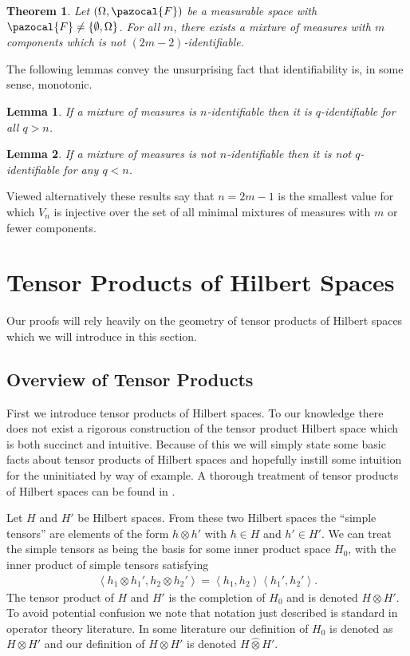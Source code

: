 \documentclass{article} %
\def\l{\left}
\def\r{\right}
\def\sF{\pazocal{F}}
\newtheorem{lem}{Lemma}
\newtheorem{thm}{Theorem}
\theoremstyle{definition}
\begin{document}
\begin{thm} \label{thm:noident}
	Let $\left( \Omega, \sF \right)$ be a measurable space with $\sF \neq \left\{ \emptyset,\Omega \right\}$. For all $m$, there exists a mixture of measures with $m$ components which is not $(2m-2)$-identifiable.
\end{thm}
The following lemmas convey the unsurprising fact that identifiability is, in some sense, monotonic. 
\begin{lem}\label{lem:ident}
	If a mixture of measures is $n$-identifiable then it is $q$-identifiable for all $q>n$.
\end{lem}
\begin{lem} \label{lem:noident}
	If a mixture of measures is not $n$-identifiable then it is not $q$-identifiable for any $q<n$.
\end{lem}
Viewed alternatively these results say that $n=2m-1$ is the smallest value for which $V_{n}$ is injective over the set of all minimal mixtures of measures with $m$ or fewer components.
\section{Tensor Products of Hilbert Spaces}
Our proofs will rely heavily on the geometry of tensor products of Hilbert spaces which we will introduce in this section.

\subsection{Overview of Tensor Products}
First we introduce tensor products of Hilbert spaces. To our knowledge there does not exist a rigorous construction of the tensor product Hilbert space which is both succinct and intuitive. Because of this we will simply state some basic facts about tensor products of Hilbert spaces and hopefully instill some intuition for the uninitiated by way of example. A thorough treatment of tensor products of Hilbert spaces can be found in \cite{kadison83}.

Let $H$ and $H'$ be Hilbert spaces. From these two Hilbert spaces the ``simple tensors'' are elements of the form $h\otimes h'$ with $h\in H$ and $h' \in H'$. We can treat the simple tensors as being the basis for some inner product space $H_0$, with the inner product of simple tensors satisfying
\begin{eqnarray*}
	\l<h_1 \otimes h_1', h_2 \otimes h_2'\r> = \l<h_1,h_2\r>\l<h_1',h_2'\r>.
\end{eqnarray*}
The tensor product of $H$ and $H'$ is the completion of $H_0$ and is denoted $H\otimes H'$. To avoid potential confusion we note that notation just described is standard in operator theory literature. In some literature our definition of $H_0$ is denoted as $H\otimes H'$ and our definition of $H \otimes H'$ is denoted $H \widehat{\otimes} H'$.
\end{document}
